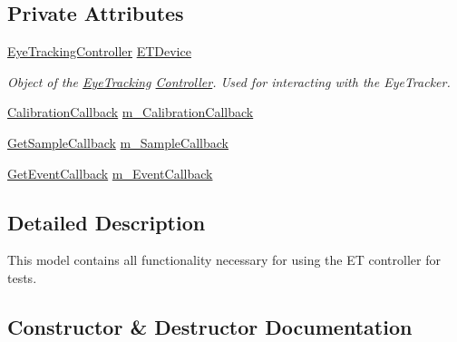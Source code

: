 \subsection*{Private Attributes}
\begin{DoxyCompactItemize}
\item 
\hyperlink{class_web_analyzer_1_1_eye_tracking_1_1_eye_tracking_controller}{Eye\+Tracking\+Controller} \hyperlink{class_web_analyzer_1_1_eye_tracking_1_1_eye_tracking_model_a8a1e9d54cc3f708adad7ea22653f6818}{E\+T\+Device}
\begin{DoxyCompactList}\small\item\em Object of the \hyperlink{namespace_web_analyzer_1_1_eye_tracking}{Eye\+Tracking} \hyperlink{namespace_web_analyzer_1_1_controller}{Controller}. Used for interacting with the Eye\+Tracker. \end{DoxyCompactList}\item 
\hyperlink{class_web_analyzer_1_1_eye_tracking_1_1_eye_tracking_model_ad6c2f20511c53eaf55a8fb18d263b51c}{Calibration\+Callback} \hyperlink{class_web_analyzer_1_1_eye_tracking_1_1_eye_tracking_model_ac209f94d8baa0d71cb3df9c7a4233c1f}{m\+\_\+\+Calibration\+Callback}
\item 
\hyperlink{class_web_analyzer_1_1_eye_tracking_1_1_eye_tracking_model_afa0ffe40b73c90761f49dec896df4baa}{Get\+Sample\+Callback} \hyperlink{class_web_analyzer_1_1_eye_tracking_1_1_eye_tracking_model_a968cb8269069b117054c23c913671380}{m\+\_\+\+Sample\+Callback}
\item 
\hyperlink{class_web_analyzer_1_1_eye_tracking_1_1_eye_tracking_model_a40785479d78104c591e53c7e2847e9ff}{Get\+Event\+Callback} \hyperlink{class_web_analyzer_1_1_eye_tracking_1_1_eye_tracking_model_a806e6c2c97d1e27187755e8d22f87d86}{m\+\_\+\+Event\+Callback}
\end{DoxyCompactItemize}


\subsection{Detailed Description}
This model contains all functionality necessary for using the E\+T controller for tests. 



\subsection{Constructor \& Destructor Documentation}
\hypertarget{class_web_analyzer_1_1_eye_tracking_1_1_eye_tracking_model_a6be62a4dc74db08b88c80aa8603a06e2}{}
